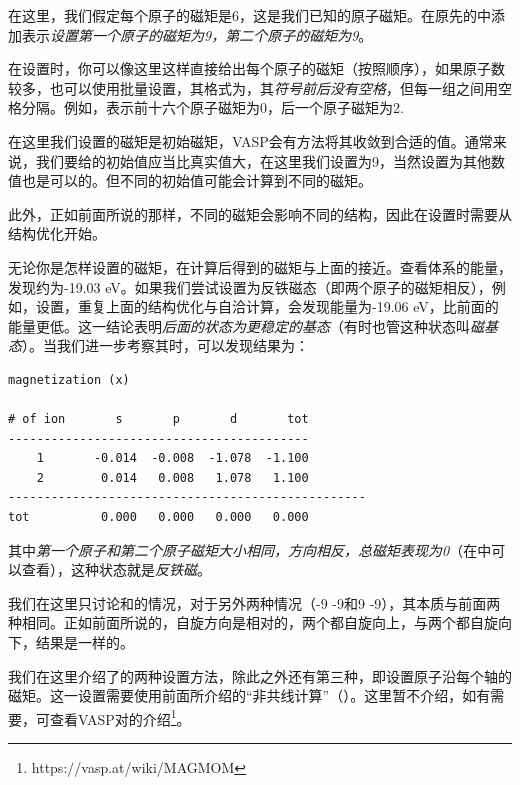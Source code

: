 在这里，我们假定每个原子的磁矩是6，这是我们已知的原子磁矩。在原先的中添加表示\emph{设置第一个原子的磁矩为9，第二个原子的磁矩为9}。

在设置时，你可以像这里这样直接给出每个原子的磁矩（按照顺序），如果原子数较多，也可以使用\code{*}批量设置，其格式为\code{[number]*[mag]}，其\emph{符号前后没有空格}，但每一组之间用空格分隔。例如，表示前十六个原子磁矩为0，后一个原子磁矩为2.

\begin{attention}
    在这里我们设置的磁矩是初始磁矩，VASP会有方法将其收敛到合适的值。通常来说，我们要给的初始值应当比真实值大，在这里我们设置为9，当然设置为其他数值也是可以的。但不同的初始值可能会计算到不同的磁矩。

    此外，正如前面所说的那样，不同的磁矩会影响不同的结构，因此在设置时需要从结构优化开始。
\end{attention}

无论你是怎样设置的磁矩，在计算后得到的磁矩与上面的接近。查看体系的能量，发现约为-19.03 eV。如果我们尝试设置为反铁磁态（即两个原子的磁矩相反），例如，设置，重复上面的结构优化与自洽计算，会发现能量为-19.06 eV，比前面的能量更低。这一结论表明\emph{后面的状态为更稳定的基态}（有时也管这种状态叫\emph{磁基态}）。当我们进一步考察其时，可以发现结果为：

\begin{lstlisting}[caption=OUTCAR]
magnetization (x)

# of ion       s       p       d       tot
------------------------------------------
    1       -0.014  -0.008  -1.078  -1.100
    2        0.014   0.008   1.078   1.100
--------------------------------------------------
tot          0.000   0.000   0.000   0.000 
\end{lstlisting}

其中\emph{第一个原子和第二个原子磁矩大小相同，方向相反，总磁矩表现为0}（在中可以查看），这种状态就是\emph{反铁磁}。

\begin{attention}
    我们在这里只讨论和的情况，对于另外两种情况（-9 -9和9 -9），其本质与前面两种相同。正如前面所说的，自旋方向是相对的，两个都自旋向上，与两个都自旋向下，结果是一样的。
\end{attention}

\begin{extend}
    我们在这里介绍了的两种设置方法，除此之外还有第三种，即设置原子沿每个轴的磁矩。这一设置需要使用前面所介绍的“非共线计算”（）。这里暂不介绍，如有需要，可查看VASP对的介绍\footnote{https://vasp.at/wiki/MAGMOM}。
\end{extend}

